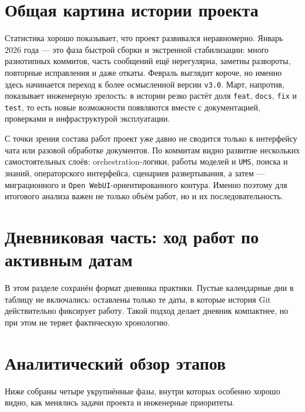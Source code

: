 \documentclass[12pt,a4paper]{article}
\begin{document}
\section{Общая картина истории проекта}



Статистика хорошо показывает, что проект развивался неравномерно. Январь 2026 года --- это фаза быстрой сборки и экстренной стабилизации: много разнотипных коммитов, часть сообщений ещё нерегулярна, заметны развороты, повторные исправления и даже откаты. Февраль выглядит короче, но именно здесь начинается переход к более осмысленной версии \texttt{v3.0}. Март, напротив, показывает инженерную зрелость: в истории резко растёт доля \texttt{feat}, \texttt{docs}, \texttt{fix} и \texttt{test}, то есть новые возможности появляются вместе с документацией, проверками и инфраструктурой эксплуатации.

С точки зрения состава работ проект уже давно не сводится только к интерфейсу чата или разовой обработке документов. По коммитам видно развитие нескольких самостоятельных слоёв: orchestration-логики, работы моделей и \texttt{UMS}, поиска и знаний, операторского интерфейса, сценариев развертывания, а затем --- миграционного и \texttt{Open WebUI}-ориентированного контура. Именно поэтому для итогового анализа важен не только объём работ, но и их последовательность.

\section{Дневниковая часть: ход работ по активным датам}

В этом разделе сохранён формат дневника практики. Пустые календарные дни в таблицу не включались: оставлены только те даты, в которые история Git действительно фиксирует работу. Такой подход делает дневник компактнее, но при этом не теряет фактическую хронологию.



\section{Аналитический обзор этапов}

Ниже собраны четыре укрупнённые фазы, внутри которых особенно хорошо видно, как менялись задачи проекта и инженерные приоритеты.


\end{document}
